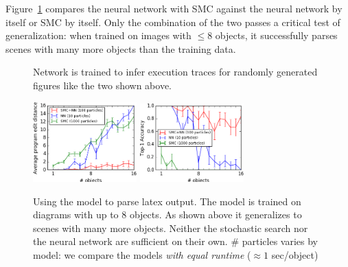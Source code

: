 \documentclass{article}
\begin{document}
Figure~\ref{syntheticResults}
compares the neural network with SMC against the neural network by
itself or SMC by itself.  Only the combination of the two passes a
critical test of generalization: when trained on images with $\leq 8$
objects, it successfully parses scenes with many more objects than the
training data.

\begin{figure}\centering
  \begin{minipage}{0.35\textwidth}
    \begin{minipage}[t]{2.2cm}\end{minipage}
    \begin{minipage}[t]{2.2cm}\end{minipage}
    \caption{Network is trained to infer execution traces for randomly generated figures like the two shown above.}\label{trainingData}
  \end{minipage}\hfill
  \begin{minipage}{0.6\textwidth}
    \includegraphics[width = 4cm]{figures/editDistance.png}
    \includegraphics[width = 4cm]{figures/accuracy.png}
      \caption{Using the model to parse latex output. The model is trained on diagrams with up to 8 objects. As shown above it generalizes to scenes with many more objects. Neither the stochastic search nor the neural network are sufficient on their own. \# particles varies by model: we compare the models \emph{with equal runtime} ($\approx 1$ sec/object)}\label{syntheticResults}
    \end{minipage}
  
  \end{figure}
\end{document}
